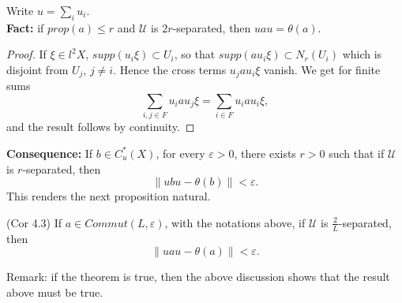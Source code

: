 Write $u=\sum_i u_i$. \\

\textbf{Fact:} if $prop(a)\leq r$ and $\mathcal U$ is $2r$-separated, then $uau=\theta(a)$.

\begin{proof}
If $\xi \in l^2 X$, $supp(u_i\xi)\subset U_i$, so that $supp(a u_i \xi ) \subset N_r(U_i)$ which is disjoint from $U_j$, $j\neq i$. Hence the cross terms $u_j a u_i \xi$ vanish. We get for finite sums \[\sum_{i,j \in F} u_i a u_j \xi =\sum_{i\in F} u_i a u_i \xi,\]
and the result follows by continuity. 
\end{proof}

\textbf{Consequence:} If $b\in C^*_u(X)$, for every $\varepsilon >0$, there exists $r>0$ such that if $\mathcal U$ is $r$-separated, then 
\[\| ubu -\theta(b)\| <\varepsilon.\]
This renders the next proposition natural.
\begin{prop}(Cor 4.3) 
If $a\in Commut(L,\varepsilon)$, with the notations above, if $\mathcal U $ is $\frac{2}{L}$-separated, then 
\[\| uau -\theta(a)\| <\varepsilon.\]
\end{prop}

Remark: if the theorem is true, then the above discussion shows that the result above must be true.\\

